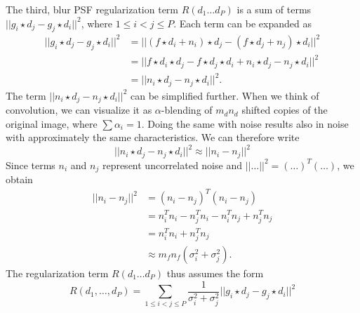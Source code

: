\documentclass[12pt,notitlepage]{report}
\begin{document}
The third, blur PSF regularization term $R(d_1 \dots d_P)$ is a sum of terms $|| g_i \star d_j - g_j \star d_i ||^2$, where $1 \leq i < j \leq P$. Each term can be expanded as 
\begin{equation}
\label{eq:srou03_R_exp}
\begin{split}
	|| g_i \star d_j - g_j \star d_i ||^2 &= || (f \star d_i + n_i) \star d_j - (f \star d_j + n_j) \star d_i ||^2 \\ &=  ||f \star d_i \star d_j - f \star d_j \star d_i +  n_i \star d_j - n_j \star d_i||^2 \\ &= ||n_i \star d_j - n_j \star d_i||^2. 	
\end{split}
\end{equation}
The term $||n_i \star d_j - n_j \star d_i||^2$ can be simplified further. When we think of convolution, we can visualize it as $\alpha$-blending of $m_d n_d$ shifted copies of the original image, where $\sum{}{} \alpha_i = 1$. Doing the same with noise results also in noise with approximately the same characteristics. We can therefore write
\begin{equation}
\label{eq:srou03_R_exp_noise}
	||n_i \star d_j - n_j \star d_i||^2 \approx ||n_i - n_j||^2 
\end{equation}
Since terms $n_i$ and $n_j$ represent uncorrelated noise and $||\dots||^2 = (\dots)^T(\dots)$, we obtain
\begin{equation}
\label{eq:srou03_R_exp_noise_approx}
\begin{split}
	||n_i - n_j||^2 &= (n_i - n_j)^T(n_i - n_j) \\ &= n_i^T n_i - n_j^T n_i - n_i^T n_j + n_j^T n_j \\ &= n_i^T n_i + n_j^T n_j \\ &\approx m_f n_f (\sigma_i^2 + \sigma_j^2).
\end{split}
\end{equation}
The regularization term $R(d_1 \dots d_P)$ thus assumes the form
\begin{equation}
\label{eq:srou03_R_ext}
	R(d_1, \dots, d_P) = \sum_{1 \leq i < j \leq P}^{} \frac{1}{\sigma_i^2 + \sigma_j^2} || g_i \star d_j - g_j \star d_i ||^2 
\end{equation}
\end{document}
